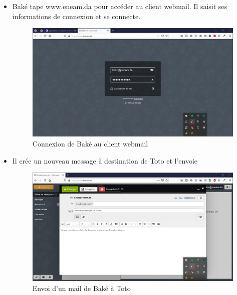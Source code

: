 \documentclass[a4paper,12pt,french]{report} %
\begin{document}
\begin{itemize}
\item Baké tape www.eneam.da pour accéder au client webmail. Il saisit ses informations de connexion et se connecte.
\begin{figure}[H]
\centering
\includegraphics[width=483pt]{figure/connexion_bake_large_screen.png}
\caption{Connexion de Baké au client webmail}
\end{figure} 
\item Il crée un nouveau message à destination de Toto et l'envoie
\begin{figure}[H]
\centering
\includegraphics[width=483pt]{figure/bake_send_mail_to_toto1.png}
\caption{Envoi d'un mail de Baké à Toto}
\end{figure}


\end{itemize}
\end{document}
